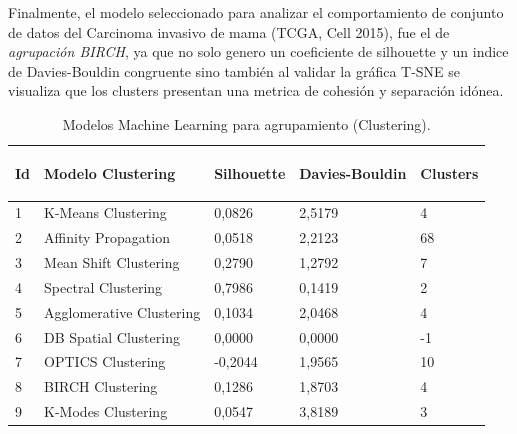 Finalmente, el modelo seleccionado para analizar el comportamiento de conjunto de datos del Carcinoma invasivo de mama (TCGA, Cell 2015), fue el de \textit{agrupación BIRCH}, ya que no solo genero un coeficiente de silhouette  y un indice de Davies-Bouldin congruente sino también al validar la gráfica T-SNE se visualiza que los clusters presentan una metrica de cohesión y separación idónea.

\begin{table} [!htb]
	\footnotesize
	\begin{threeparttable}
		\caption{Modelos Machine Learning para agrupamiento (Clustering).}
		\label{Clustering_Models}
		\begin{tabular}{p{1cm} p{6cm} p{2.5cm} p{2.5cm} p{1.5cm}} \toprule	
		\begin{center}Id\end{center}
		&\begin{center}Modelo Clustering\end{center}
		&\begin{center}Silhouette\end{center}
		&\begin{center}Davies-Bouldin\end{center}
		&\begin{center}Clusters\end{center}
		\\ \hline 1 & K-Means Clustering 	&	0,0826	&	2,5179	&	4
		\\ \hline 2 & Affinity Propagation	&	0,0518	&	2,2123	&	68
		\\ \hline 3 & Mean Shift Clustering 	&	0,2790	&	1,2792	&	7
		\\ \hline 4 & Spectral Clustering	&	0,7986	&	0,1419	&	2
		\\ \hline 5 & Agglomerative Clustering	&	0,1034	&	2,0468	&	4
		\\ \hline 6 & DB Spatial Clustering 	&	0,0000	&	0,0000	&	-1
		\\ \hline 7 & OPTICS Clustering	&	-0,2044	&	1,9565	&	10
		\\ \hline 8 & BIRCH Clustering	&	0,1286	&	1,8703	&	4
		\\ \hline 9 & K-Modes Clustering	&	0,0547	&	3,8189	&	3
		\\ \hline
		\end{tabular}
	\end{threeparttable}
\end{table}


